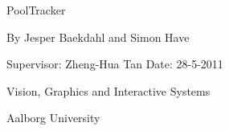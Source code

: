 \begin{titlingpage}
  \thispagestyle{empty}
  \centering
  { \setlength{\baselineskip}{24pt}
    {\Huge PoolTracker
    }\par
    \par\vspace*{4\onelineskip}
    \par




    \par\vspace*{2\onelineskip}
	\par\par
    \par
    
    \large By Jesper Baekdahl and Simon Have
  }
  \vfill
  \vspace*{2\onelineskip}
  Supervisor: Zheng-Hua Tan
  Date: 28-5-2011
  \par\vspace*{2\onelineskip}
  \small
  Vision, Graphics and Interactive Systems\par
  Aalborg University
  \enlargethispage{2\onelineskip}
\end{titlingpage}
